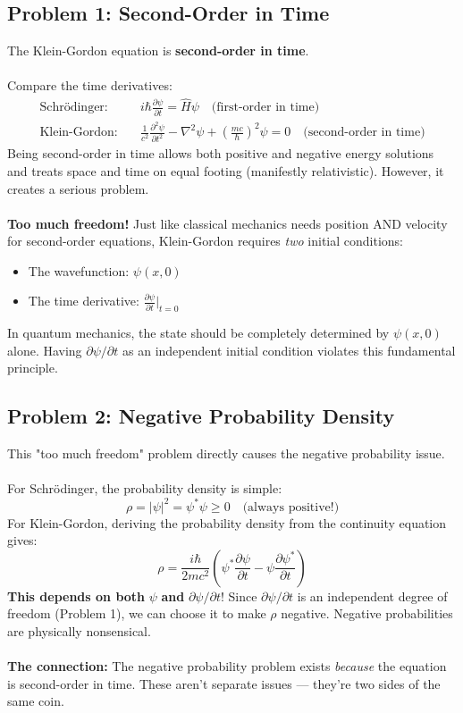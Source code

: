\documentclass{report}
\begin{document}
\subsection{Problem 1: Second-Order in Time}
The Klein-Gordon equation is \textbf{second-order in time}.\\
\\
Compare the time derivatives:
\begin{align*}
	\text{Schr\"{o}dinger:} & \quad i\hbar \frac{\partial \psi}{\partial t} = \hat{H}\psi \quad \text{(first-order in time)}                                                       \\
	\text{Klein-Gordon:}    & \quad \frac{1}{c^2}\frac{\partial^2 \psi}{\partial t^2} - \nabla^2\psi + \left(\frac{mc}{\hbar}\right)^2\psi = 0 \quad \text{(second-order in time)}
\end{align*}
Being second-order in time allows both positive and negative energy solutions and treats space and time on equal footing (manifestly relativistic). However, it creates a serious problem.\\
\\
\textbf{Too much freedom!} Just like classical mechanics needs position AND velocity for second-order equations, Klein-Gordon requires \textit{two} initial conditions:
\begin{itemize}
	\item The wavefunction: $\psi(x, 0)$
	\item The time derivative: $\frac{\partial \psi}{\partial t}\bigg|_{t=0}$
\end{itemize}
In quantum mechanics, the state should be completely determined by $\psi(x,0)$ alone. Having $\partial\psi/\partial t$ as an independent initial condition violates this fundamental principle.

\subsection{Problem 2: Negative Probability Density}
This "too much freedom" problem directly causes the negative probability issue.\\
\\
For Schr\"{o}dinger, the probability density is simple:
\begin{equation}
	\rho = |\psi|^2 = \psi^* \psi \geq 0 \quad \text{(always positive!)}
\end{equation}
For Klein-Gordon, deriving the probability density from the continuity equation gives:
\begin{equation}
	\rho = \frac{i\hbar}{2mc^2}\left(\psi^* \frac{\partial \psi}{\partial t} - \psi \frac{\partial \psi^*}{\partial t}\right)
\end{equation}
\textbf{This depends on both} $\psi$ \textbf{and} $\partial\psi/\partial t$! Since $\partial\psi/\partial t$ is an independent degree of freedom (Problem 1), we can choose it to make $\rho$ negative. Negative probabilities are physically nonsensical.\\
\\
\textbf{The connection:} The negative probability problem exists \textit{because} the equation is second-order in time. These aren't separate issues --- they're two sides of the same coin.
\end{document}
